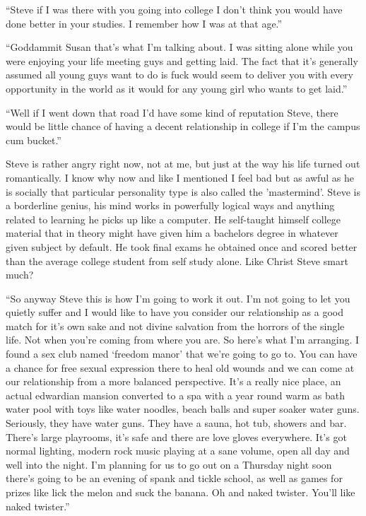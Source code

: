 ``Steve if I was there with you going into college I don't think you would have done better in your studies. I remember how I was at that age.''

``Goddammit Susan that's what I'm talking about. I was sitting alone while you were enjoying your life meeting guys and getting laid. The fact that it's generally assumed all young guys want to do is fuck would seem to deliver you with every opportunity in the world as it would for any young girl who wants to get laid.''

``Well if I went down that road I'd have some kind of reputation Steve, there would be little chance of having a decent relationship in college if I'm the campus cum bucket.''

Steve is rather angry right now, not at me, but just at the way his life turned out romantically. I know why now and like I mentioned I feel bad but as awful as he is socially that particular personality type is also called the 'mastermind'. Steve is a borderline genius, his mind works in powerfully logical ways and anything related to learning he picks up like a computer. He self-taught himself college material that in theory might have given him a bachelors degree in whatever given subject by default. He took final exams he obtained once and scored better than the average college student from self study alone. Like Christ Steve smart much?

``So anyway Steve this is how I'm going to work it out. I'm not going to let you quietly suffer and I would like to have you consider our relationship as a good match for it's own sake and not divine salvation from the horrors of the single life. Not when you're coming from where you are. So here's what I'm arranging. I found a sex club named `freedom manor' that we're going to go to. You can have a chance for free sexual expression there to heal old wounds and we can come at our relationship from a more balanced perspective. It's a really nice place, an actual edwardian mansion converted to a spa with a year round warm as bath water pool with toys like water noodles, beach balls and super soaker water guns. Seriously, they have water guns. They have a sauna, hot tub, showers and bar. There's large playrooms, it's safe and there are love gloves everywhere. It's got normal lighting, modern rock music playing at a sane volume, open all day and well into the night. I'm planning for us to go out on a Thursday night soon there's going to be an evening of spank and tickle school, as well as games for prizes like lick the melon and suck the banana. Oh and naked twister. You'll like naked twister.''

